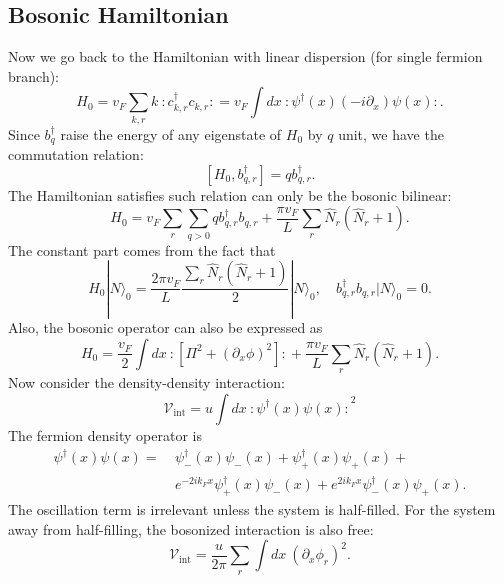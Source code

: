 \documentclass[aps,prb,superscriptaddress,nofootinbib]{revtex4}
\begin{document}
\subsection{Bosonic Hamiltonian}
Now we go back to the Hamiltonian with linear dispersion (for single fermion branch):
\begin{equation}
	H_0 = v_F \sum_{k,r} k\ {:\mathrel{c_{k,r}^\dagger c_{k,r}}:} 
	= v_F \int dx\ {:\mathrel{\psi^\dagger(x)(-i\partial_x)\psi(x)}:}.
\end{equation}
Since $b_q^\dagger$ raise the energy of any eigenstate of $H_0$ by $q$ unit, we have the commutation relation:
\begin{equation}
	\left[H_0,b_{q,r}^\dagger\right] = q b_{q,r}^\dagger.
\end{equation}
The Hamiltonian satisfies such relation can only be the bosonic bilinear:
\begin{equation}
	H_0 = v_F \sum_{r}\sum_{q>0} q b_{q,r}^\dagger b_{q,r} + \frac{\pi v_F}{L} \sum_r \hat{N}_r(\hat{N}_r+1).
\end{equation}
The constant part comes from the fact that
\begin{equation}
	H_0|N\rangle_0 = \frac{2\pi v_F}{L} \frac{\sum_r\hat{N}_r(\hat{N}_r+1)}{2}|N\rangle_0, \quad
	b_{q,r}^\dagger b_{q,r} |N\rangle_0 = 0.
\end{equation}
Also, the bosonic operator can also be expressed as
\begin{equation}
	H_0 = \frac{v_F}{2} \int dx\ {:\mathrel{\left[\Pi^2 + (\partial_x \phi)^2\right]}:} + \frac{\pi v_F}{L}\sum_r \hat{N}_r(\hat{N}_r+1).
\end{equation}
Now consider the density-density interaction:
\begin{equation}
	\mathcal V_{\mathrm{int}} = u \int dx\ {:\mathrel{\psi^\dagger(x)\psi(x)}:}^2
\end{equation}
The fermion density operator is
\begin{equation}
\begin{aligned}
	\psi^\dagger(x)\psi(x) =&\ \psi_-^\dagger(x)\psi_-(x) + \psi_+^\dagger(x)\psi_+(x) + \\
	&\ e^{-2ik_F x} \psi_+^\dagger(x)\psi_-(x)+e^{2ik_F x}\psi_-^\dagger(x)\psi_+(x).
\end{aligned}
\end{equation}
The oscillation term is irrelevant unless the system is half-filled.
For the system away from half-filling, the bosonized interaction is also free:
\begin{equation}
	\mathcal V_\mathrm{int} = \frac{u}{2\pi}\sum_r \int dx\ (\partial_x\phi_r)^2.
\end{equation}
\end{document}
